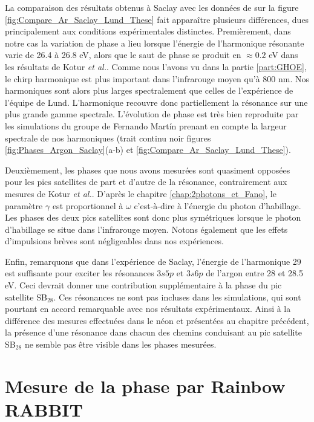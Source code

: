 La comparaison des résultats obtenus à Saclay avec les données de  sur la figure \ref{fig:Compare_Ar_Saclay_Lund_These} fait apparaître plusieurs différences, dues principalement aux conditions expérimentales distinctes. Premièrement, dans notre cas la variation de phase a lieu lorsque l'énergie de l'harmonique résonante varie de 26.4 à 26.8 eV, alors que le saut de phase se produit en $\approx 0.2$ eV dans les résultats de Kotur \textit{et al.}. Comme nous l'avons vu dans la partie \ref{part:GHOE}, le chirp harmonique est plus important dans l'infrarouge moyen qu'à 800 nm. Nos harmoniques sont alors plus larges spectralement que celles de l'expérience de l'équipe de Lund. L'harmonique recouvre donc partiellement la résonance sur une plus grande gamme spectrale. L'évolution de phase est très bien reproduite par les simulations du groupe de Fernando Mart\'{i}n prenant en compte la largeur spectrale de nos harmoniques (trait continu noir figures 
\ref{fig:Phases_Argon_Saclay}(a-b) et \ref{fig:Compare_Ar_Saclay_Lund_These}).

Deuxièmement, les phases que nous avons mesurées sont quasiment opposées pour les pics satellites de part et d'autre de la résonance, contrairement aux mesures de Kotur \textit{et al.}. D'après le chapitre \ref{chap:2photons_et_Fano}, le paramètre $\gamma$ est proportionnel à $\omega$ c'est-à-dire à l'énergie du photon d'habillage. Les phases des deux pics satellites sont donc plus symétriques lorsque le photon d'habillage se situe dans l'infrarouge moyen. Notons également que les effets d'impulsions brèves sont négligeables dans nos expériences. 

Enfin, remarquons que dans l'expérience de Saclay, l'énergie de l'harmonique 29 est suffisante pour exciter les résonances $3s5p$ et $3s6p$ de l'argon entre 28 et 28.5 eV. Ceci devrait donner une contribution supplémentaire à la phase du pic satellite SB$_{28}$. Ces résonances ne sont pas incluses dans les simulations, qui sont pourtant en accord remarquable avec nos résultats expérimentaux. Ainsi à la différence des mesures effectuées dans le néon et présentées au chapitre précédent, la présence d'une résonance dans chacun des chemins conduisant au pic satellite SB$_{28}$ ne semble pas être visible dans les phases mesurées.

\section{Mesure de la phase par Rainbow RABBIT}
\label{sec:ArRainbow}
